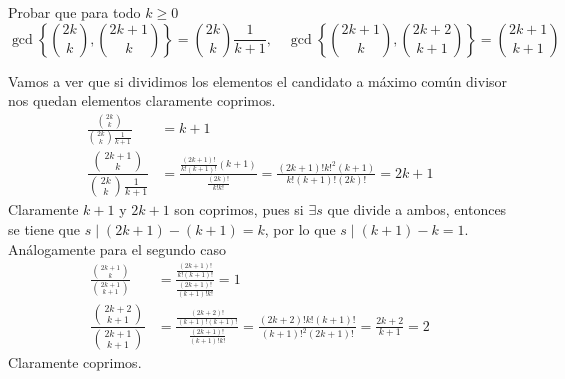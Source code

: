 \documentclass[twoside]{article}
\begin{document}
\begin{ejercicio}{2}
Probar que para todo $k\geq 0$
\[
\gcd \left\{\binom{2k}{k},\binom{2k+1}{k}\right\}=\binom{2k}{k}\frac{1}{k+1}, \quad \gcd \left\{\binom{2k+1}{k},\binom{2k+2}{k+1}\right\}=\binom{2k+1}{k+1}
\]
\begin{solucion}
Vamos a ver que si dividimos los elementos el candidato a máximo común divisor nos quedan elementos claramente coprimos.
\begin{align*}
\frac{\binom{2k}{k}}{\binom{2k}{k}\frac{1}{k+1}}&=k+1\\
\dfrac{\binom{2k+1}{k}}{\binom{2k}{k}\frac{1}{k+1}}&=\frac{\frac{(2k+1)!}{k!(k+1)!}(k+1)}{\frac{(2k)!}{k!k!}} = \frac{(2k+1)!k!^2(k+1)}{k!(k+1)!(2k)!}=2k+1
\end{align*}
Claramente $k+1$ y $2k+1$ son coprimos, pues si $\exists s$ que divide a ambos, entonces se tiene que $s\mid (2k+1)-(k+1) = k$, por lo que $s \mid (k+1)-k =1$. Análogamente para el segundo caso
\begin{align*}
\frac{\binom{2k+1}{k}}{\binom{2k+1}{k+1}}&=\frac{\frac{(2k+1)!}{k!(k+1)!}}{\frac{(2k+1)!}{(k+1)!k!}}=1\\
\dfrac{\binom{2k+2}{k+1}}{\binom{2k+1}{k+1}}&=\frac{\frac{(2k+2)!}{(k+1)!(k+1)!}}{\frac{(2k+1)!}{(k+1)!k!}} = \frac{(2k+2)!k!(k+1)!}{(k+1)!^2(2k+1)!}=\frac{2k+2}{k+1}=2
\end{align*}
Claramente coprimos.
\end{solucion}
\end{ejercicio}


\newpage
\end{document}
